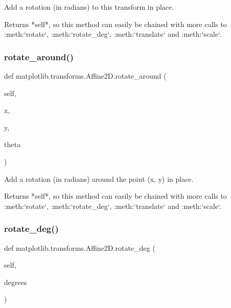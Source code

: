 \begin{DoxyVerb}Add a rotation (in radians) to this transform in place.

Returns *self*, so this method can easily be chained with more
calls to :meth:`rotate`, :meth:`rotate_deg`, :meth:`translate`
and :meth:`scale`.
\end{DoxyVerb}
 \mbox{\label{classmatplotlib_1_1transforms_1_1Affine2D_a0e6c538c0e3dae6980c3ff2868a7ad42}} 
\subsubsection{\texorpdfstring{rotate\+\_\+around()}{rotate\_around()}}
{\footnotesize\ttfamily def matplotlib.\+transforms.\+Affine2\+D.\+rotate\+\_\+around (\begin{DoxyParamCaption}\item[{}]{self,  }\item[{}]{x,  }\item[{}]{y,  }\item[{}]{theta }\end{DoxyParamCaption})}

\begin{DoxyVerb}Add a rotation (in radians) around the point (x, y) in place.

Returns *self*, so this method can easily be chained with more
calls to :meth:`rotate`, :meth:`rotate_deg`, :meth:`translate`
and :meth:`scale`.
\end{DoxyVerb}
 \mbox{\label{classmatplotlib_1_1transforms_1_1Affine2D_a923dd261e2b25d874a510d1c209ba51e}} 
\subsubsection{\texorpdfstring{rotate\+\_\+deg()}{rotate\_deg()}}
{\footnotesize\ttfamily def matplotlib.\+transforms.\+Affine2\+D.\+rotate\+\_\+deg (\begin{DoxyParamCaption}\item[{}]{self,  }\item[{}]{degrees }\end{DoxyParamCaption})}

